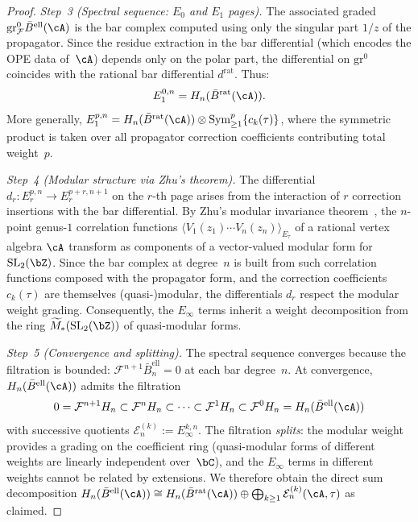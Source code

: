 \begin{proof}
\emph{Step~3 (Spectral sequence: $E_0$ and $E_1$ pages).}
The associated graded $\mathrm{gr}^0_{\mathcal{F}}
\bar{B}^{\mathrm{ell}}(\cA)$ is the bar complex computed using only the
singular part $1/z$ of the propagator. Since the residue extraction
in the bar differential (which encodes the OPE data of~$\cA$) depends
only on the polar part, the differential on $\mathrm{gr}^0$ coincides
with the rational bar differential $d^{\mathrm{rat}}$. Thus:
\[
E_1^{0,n} = H_n(\bar{B}^{\mathrm{rat}}(\cA)).
\]
More generally, $E_1^{p,n} = H_n(\bar{B}^{\mathrm{rat}}(\cA)) \otimes
\mathrm{Sym}^p_{\geq 1}\{c_k(\tau)\}$, where the symmetric product is
taken over all propagator correction coefficients contributing total
weight~$p$.

\emph{Step~4 (Modular structure via Zhu's theorem).}
The differential $d_r \colon E_r^{p,n} \to E_r^{p+r,n+1}$ on the
$r$-th page arises from the interaction of $r$ correction insertions
with the bar differential. By Zhu's modular invariance
theorem~\cite{Zhu96}, the $n$-point genus-$1$ correlation functions
$\langle V_1(z_1) \cdots V_n(z_n) \rangle_{E_\tau}$ of a rational
vertex algebra $\cA$ transform as components of a vector-valued modular
form for $\mathrm{SL}_2(\bZ)$. Since the bar complex at degree~$n$ is
built from such correlation functions composed with the propagator form,
and the correction coefficients $c_k(\tau)$ are themselves
(quasi-)modular, the differentials $d_r$ respect the modular weight
grading. Consequently, the $E_\infty$ terms inherit a weight
decomposition from the ring $\widetilde{M}_*(\mathrm{SL}_2(\bZ))$
of quasi-modular forms.

\emph{Step~5 (Convergence and splitting).}
The spectral sequence converges because the filtration is bounded:
$\mathcal{F}^{n+1}\bar{B}^{\mathrm{ell}}_n = 0$ at each bar
degree~$n$. At convergence, $H_n(\bar{B}^{\mathrm{ell}}(\cA))$
admits the filtration
\[
0 = \mathcal{F}^{n+1} H_n \subset \mathcal{F}^n H_n \subset \cdots
\subset \mathcal{F}^1 H_n \subset \mathcal{F}^0 H_n
= H_n(\bar{B}^{\mathrm{ell}}(\cA))
\]
with successive quotients $\mathcal{E}^{(k)}_n := E_\infty^{k,n}$.
The filtration \emph{splits}: the modular weight provides a grading
on the coefficient ring (quasi-modular forms of different weights are
linearly independent over~$\bC$), and the $E_\infty$ terms in
different weights cannot be related by extensions. We therefore
obtain the direct sum decomposition
$H_n(\bar{B}^{\mathrm{ell}}(\cA)) \cong H_n(\bar{B}^{\mathrm{rat}}(\cA))
\oplus \bigoplus_{k \geq 1} \mathcal{E}^{(k)}_n(\cA, \tau)$
as claimed.


\end{proof}

